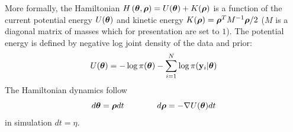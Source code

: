 \documentclass[]{article}
\begin{document}
More formally, the Hamiltonian $H\left({\bm \theta}, {\bm \rho} \right) = U({\bm \theta}) + K({\bm \rho})$ is a function of the current potential energy $U({\bm \theta})$ and kinetic energy $K({\bm \rho}) = {\bm \rho}^T M^{-1}{\bm \rho}/2$ ($M$ is a diagonal matrix of masses which for presentation are set to $1$).  The potential energy is defined by negative log joint density of the data and prior:
\begin{equation}
  U({\bm \theta}) = - \log \pi({\bm \theta}) - \sum_{i=1}^N \log \pi({\bf y}_i | {\bm \theta} )
\end{equation}
The Hamiltonian dynamics follow 
\begin{equation}
  d{\bm \theta} = {\bm \rho} dt ~~~~~~~~~~~~ d{\bm \rho} = -\nabla U({\bm \theta}) dt
\end{equation}
in simulation $dt = \eta$. 



\end{document}
